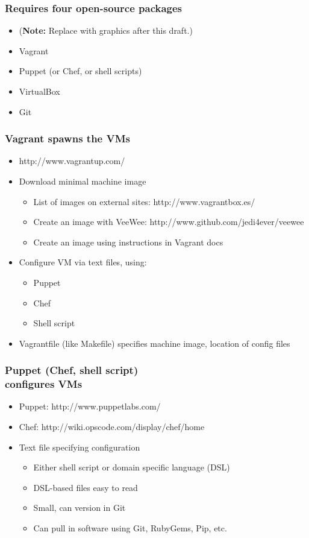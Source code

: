 \documentclass [14pt]{beamer}
\begin{document}
\begin{frame}
\frametitle{Requires four open-source packages}
\begin{itemize}
\item (\textbf{Note:} Replace with graphics after this draft.)
\item Vagrant
\item Puppet (or Chef, or shell scripts)
\item VirtualBox
\item Git
\end{itemize}
\end{frame}

\begin{frame}
\frametitle{Vagrant spawns the VMs}
\begin{itemize}
\item http://www.vagrantup.com/
\item Download minimal machine image
\begin{itemize}
\item List of images on external sites: http://www.vagrantbox.es/
\item Create an image with VeeWee:
  http://www.github.com/jedi4ever/veewee
\item Create an image using instructions in Vagrant docs
\end{itemize}
\item Configure VM via text files, using:
\begin{itemize}
\item Puppet
\item Chef
\item Shell script  
\end{itemize}
\item Vagrantfile (like Makefile) specifies machine image, location of config files
\end{itemize}
\end{frame}

\begin{frame}
\frametitle{Puppet (Chef, shell script)\\
configures VMs}
\begin{itemize}
\item Puppet: http://www.puppetlabs.com/
\item Chef: http://wiki.opscode.com/display/chef/home
\item Text file specifying configuration
\begin{itemize}
\item Either shell script or domain specific language (DSL)
\item DSL-based files easy to read
\item Small, can version in Git
\item Can pull in software using Git, RubyGems, Pip, etc.
\end{itemize}
\end{itemize}
\end{frame}
\end{document}

